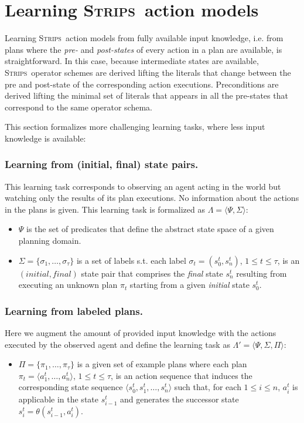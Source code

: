 \documentclass[letterpaper]{article} %
\newcommand{\tup}[1]{{\langle #1 \rangle}}
\newcommand{\strips}{\textsc{Strips}}     %
\begin{document}
\section{Learning \strips\ action models}
Learning \strips\ action models from fully available input knowledge, i.e. from plans where the {\em pre-} and {\em post-states} of every action in a plan are available, is straightforward. In this case, because intermediate states are available, \strips\ operator schemes are derived lifting the literals that change between the pre and post-state of the corresponding action executions. Preconditions are derived lifting the minimal set of literals that appears in all the pre-states that correspond to the same operator schema.

This section formalizes more challenging learning tasks, where less input knowledge is available:

\subsubsection{Learning from (initial, final) state pairs.} This learning task corresponds to observing an agent acting in the world but watching only the results of its plan executions. No information about the actions in the plans is given. This learning task is formalized as $\Lambda=\tup{\Psi,\Sigma}$:
\begin{itemize}
\item $\Psi$ is the set of predicates that define the abstract state space of a given planning domain.
\item $\Sigma=\{\sigma_1,\ldots,\sigma_{\tau}\}$ is a set of labels s.t. each label $\sigma_t=(s_0^t,s_{n}^t)$, {\tt\small $1\leq t\leq \tau$}, is an $(initial, final)$ state pair that comprises the {\em final} state $s_{n}^t$ resulting from executing an unknown plan $\pi_t$ starting from a given {\em initial} state $s_0^t$.
\end{itemize}

\subsubsection{Learning from labeled plans.}
Here we augment the amount of provided input knowledge with the actions executed by the observed agent and define the learning task as $\Lambda'=\tup{\Psi,\Sigma,\Pi}$:

\begin{itemize}
\item $\Pi=\{\pi_1,\ldots,\pi_{\tau}\}$ is a given set of example plans where each plan $\pi_t=\tup{a_1^t, \ldots, a_n^t}$, {\small $1\leq t\leq \tau$}, is an action sequence that induces the corresponding state sequence $\tup{s_0^t, s_1^t, \ldots, s_n^t}$ such that, for each {\small $1\leq i\leq n$}, $a_i^t$ is applicable in the state $s_{i-1}^t$ and generates the successor state $s_i^t=\theta(s_{i-1}^t,a_i^t)$.
\end{itemize}
\end{document}
